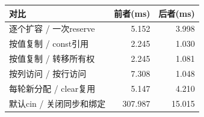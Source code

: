 \begin{longtable}{p{85mm}r r}\toprule 对比 & 前者(ms) & 后者(ms)\\\midrule\endhead
逐个扩容 / 一次reserve & 5.152 & 3.998\\
按值复制 / const引用 & 2.245 & 1.030\\
按值复制 / 转移所有权 & 2.245 & 1.081\\
按列访问 / 按行访问 & 7.308 & 1.048\\
每轮新分配 / clear复用 & 5.147 & 4.210\\
默认cin / 关闭同步和绑定 & 307.987 & 15.015\\
\bottomrule\end{longtable}
